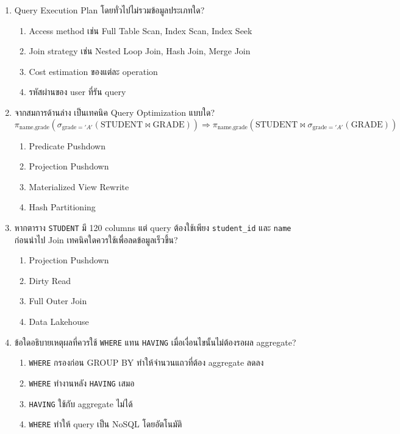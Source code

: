 \documentclass[a4paper,12pt]{article}
\begin{document}
\begin{enumerate}[label=\textbf{\arabic*.}]
    \item Query Execution Plan โดยทั่วไปไม่รวมข้อมูลประเภทใด?
    \begin{enumerate}[label=\alph*.]
        \item Access method เช่น Full Table Scan, Index Scan, Index Seek
        \item Join strategy เช่น Nested Loop Join, Hash Join, Merge Join
        \item Cost estimation ของแต่ละ operation
        \item รหัสผ่านของ user ที่รัน query
    \end{enumerate}

    \item จากสมการด้านล่าง เป็นเทคนิค Query Optimization แบบใด?\\
    \[
    \pi_{\text{name},\text{grade}}(\sigma_{\text{grade}='A'}(\text{STUDENT}\bowtie\text{GRADE}))
    \Rightarrow
    \pi_{\text{name},\text{grade}}(\text{STUDENT}\bowtie\sigma_{\text{grade}='A'}(\text{GRADE}))
    \]
    \begin{enumerate}[label=\alph*.]
        \item Predicate Pushdown
        \item Projection Pushdown
        \item Materialized View Rewrite
        \item Hash Partitioning
    \end{enumerate}

    \item หากตาราง \texttt{STUDENT} มี 120 columns แต่ query ต้องใช้เพียง \texttt{student\_id} และ \texttt{name} ก่อนนำไป Join เทคนิคใดควรใช้เพื่อลดข้อมูลเร็วขึ้น?
    \begin{enumerate}[label=\alph*.]
        \item Projection Pushdown
        \item Dirty Read
        \item Full Outer Join
        \item Data Lakehouse
    \end{enumerate}

    \item ข้อใดอธิบายเหตุผลที่ควรใช้ \texttt{WHERE} แทน \texttt{HAVING} เมื่อเงื่อนไขนั้นไม่ต้องรอผล aggregate?
    \begin{enumerate}[label=\alph*.]
        \item \texttt{WHERE} กรองก่อน GROUP BY ทำให้จำนวนแถวที่ต้อง aggregate ลดลง
        \item \texttt{WHERE} ทำงานหลัง \texttt{HAVING} เสมอ
        \item \texttt{HAVING} ใช้กับ aggregate ไม่ได้
        \item \texttt{WHERE} ทำให้ query เป็น NoSQL โดยอัตโนมัติ
    \end{enumerate}


\end{enumerate}
\end{document}
